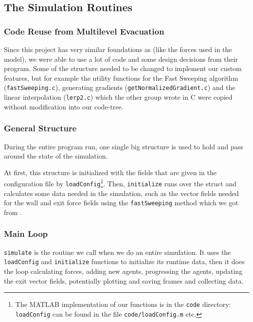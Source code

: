 \documentclass[11pt]{article}
\begin{document}
\subsection{The Simulation Routines}
\label{sub:The simulation Routines}

\subsubsection{Code Reuse from Multilevel Evacuation}

Since this project has very similar foundations as \cite{multilevel} (like the
forces used in the model), we were able to use a lot of code and some design
decisions from their program.  Some of the structure needed to be changed to
implement our custom features, but for example the utility functions for the
Fast Sweeping algorithm (\texttt{fastSweeping.c}), generating gradients
(\texttt{getNormalizedGradient.c}) and the linear interpolation
(\texttt{lerp2.c}) which the other group wrote in C were copied without
modification into our code-tree.

\subsubsection{General Structure}

\label{sub:structure}

During the entire program run, one single big structure is used to hold and
pass around the state of the simulation.

At first, this structure is initialized with the fields that are given in the
configuration file by \texttt{loadConfig}\footnote{The MATLAB implementation of
our functions is in the \texttt{code} directory: \texttt{loadConfig} can be
found in the file \texttt{code/loadConfig.m} etc.}.  Then, \texttt{initialize}
runs over the struct and calculates some data needed in the simulation, such as
the vector fields needed for the wall and exit force fields using the
\texttt{fastSweeping} method which we got from \cite{multilevel}.

\subsubsection{Main Loop}

\texttt{simulate} is the routine we call when we do an entire simulation.  It
uses the \texttt{loadConfig} and \texttt{initialize} functions to initialize
its runtime data, then it does the loop calculating forces, adding new agents,
progressing the agents, updating the exit vector fields, potentially plotting
and saving frames and collecting data.
\end{document}

